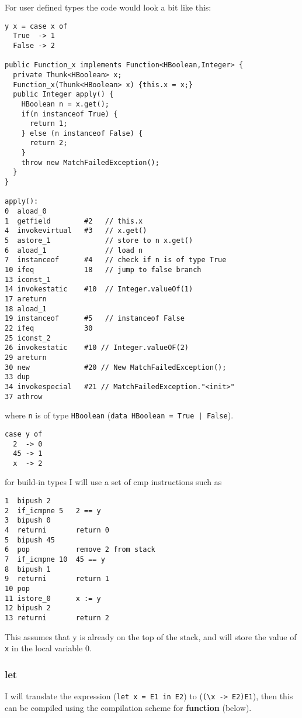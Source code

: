 \documentclass[12pt,a4paper,twoside]{article}
\begin{document}
For user defined types the code would look a bit like this:

\begin{verbatim}
y x = case x of
  True  -> 1
  False -> 2

public Function_x implements Function<HBoolean,Integer> {
  private Thunk<HBoolean> x;
  Function_x(Thunk<HBoolean> x) {this.x = x;}
  public Integer apply() {
    HBoolean n = x.get();
    if(n instanceof True) {
      return 1;
    } else (n instanceof False) {
      return 2;
    }
    throw new MatchFailedException();
  }
}

apply():
0  aload_0
1  getfield        #2   // this.x
4  invokevirtual   #3   // x.get()
5  astore_1             // store to n x.get()
6  aload_1              // load n
7  instanceof      #4   // check if n is of type True
10 ifeq            18   // jump to false branch 
13 iconst_1 
14 invokestatic    #10  // Integer.valueOf(1)
17 areturn
18 aload_1 
19 instanceof      #5   // instanceof False
22 ifeq            30
25 iconst_2       
26 invokestatic    #10 // Integer.valueOF(2)
29 areturn
30 new             #20 // New MatchFailedException();
33 dup
34 invokespecial   #21 // MatchFailedException."<init>"
37 athrow
\end{verbatim}

where \texttt{n} is of type \texttt{HBoolean} (\texttt{data HBoolean = True | False}).


\begin{verbatim}
case y of
  2  -> 0
  45 -> 1
  x  -> 2
\end{verbatim}

for build-in types I will use a set of cmp instructions such as

\begin{verbatim}
1  bipush 2       
2  if_icmpne 5   2 == y
3  bipush 0      
4  returni       return 0
5  bipush 45
6  pop           remove 2 from stack
7  if_icmpne 10  45 == y
8  bipush 1    
9  returni       return 1
10 pop
11 istore_0      x := y
12 bipush 2      
13 returni       return 2
\end{verbatim}

This assumes that y is already on the top of the stack, and will store the value of \texttt{x} in the local
variable 0.

\subsubsection{let} 

I will translate the expression (\texttt{let x = E1 in E2}) to (\texttt{(\textbackslash x -> E2)E1}), then 
this can be compiled using the compilation scheme for \textbf{function} (below).
\end{document}
